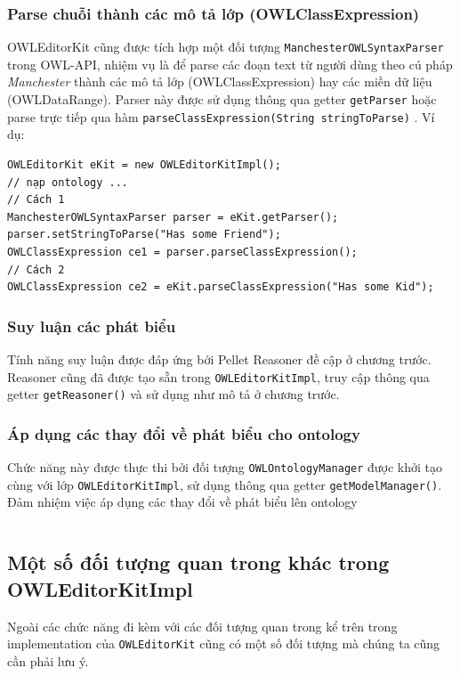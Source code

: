 \subsubsection{Parse chuỗi thành các mô tả lớp (OWLClassExpression)}
OWLEditorKit cũng được tích hợp một đối tượng \verb|ManchesterOWLSyntaxParser| trong OWL-API, nhiệm vụ là để parse các đoạn text từ người dùng theo cú pháp \textit{Manchester} thành các mô tả lớp (OWLClassExpression) hay các miền dữ liệu (OWLDataRange). Parser này được sử dụng thông qua getter \verb|getParser| hoặc parse trực tiếp qua hàm \verb|parseClassExpression(String stringToParse)| . Ví dụ:
\begin{verbatim}
OWLEditorKit eKit = new OWLEditorKitImpl();
// nạp ontology ...
// Cách 1
ManchesterOWLSyntaxParser parser = eKit.getParser();
parser.setStringToParse("Has some Friend");
OWLClassExpression ce1 = parser.parseClassExpression();
// Cách 2 
OWLClassExpression ce2 = eKit.parseClassExpression("Has some Kid");
\end{verbatim}

\subsubsection{Suy luận các phát biểu}
Tính năng suy luận được đáp ứng bới Pellet Reasoner đề cập ở chương trước. Reasoner cũng đã được tạo sẵn trong \verb|OWLEditorKitImpl|, truy cập thông qua getter \verb|getReasoner()| và sử dụng như mô tả ở chương trước.

\subsubsection{Áp dụng các thay đổi về phát biểu cho ontology}
Chức năng này được thực thi bởi đối tượng \verb|OWLOntologyManager| được khởi tạo cùng với lớp \verb|OWLEditorKitImpl|, sử dụng thông qua getter \verb|getModelManager()|.  
Đảm nhiệm việc áp dụng các thay đổi về phát biểu lên ontology
\begin{verbatim}

\end{verbatim}

\subsection{Một số đối tượng quan trong khác trong OWLEditorKitImpl}
Ngoài các chức năng đi kèm với các đối tượng quan trong kể trên trong implementation của \verb|OWLEditorKit| cũng có một số đối tượng mà chúng ta cũng cần phải lưu ý.
